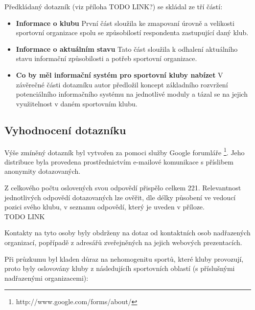 \documentclass[11pt,oneside]{fithesis}
\begin{document}
                Předkládaný dotazník (viz příloha TODO LINK?) se skládal ze tří částí:

                \begin{itemize}
                    \item \textbf{Informace o klubu} \newline
                    První část sloužila ke zmapovaní úrovně a velikosti sportovní organizace spolu se způsobilostí respondenta zastupující daný klub.
                    \item \textbf{Informace o aktuálním stavu} \newline
                    Tato část sloužila k odhalení aktuálního stavu informační způsobilosti a potřeb sportovní organizace.
                    \item \textbf{Co by měl informační systém pro sportovní kluby nabízet} \newline
                    V závěrečné části dotazníku autor předložil koncept základního rozvržení potenciálního informačního systému na jednotlivé moduly a tázal se na jejich využitelnost v daném sportovním klubu.
                \end{itemize}

                \subsection{Vyhodnocení dotazníku}
                Výše zmíněný dotazník byl vytvořen za pomoci služby Google forumláře \footnote{http://www.google.com/forms/about/}. Jeho distribuce byla provedena prostřednictvím e-mailové komunikace s příslibem anonymity dotazovaných. 

                Z celkového počtu oslovených svou odpovědí přispělo celkem 221. Relevantnost jednotlivých odpovědí dotazovaných lze ověřit, dle délky působení ve vedoucí pozici svého klubu, v seznamu odpovědí, který je uveden v příloze.\\ TODO LINK

                Kontakty na tyto osoby byly obdrženy na dotaz od kontaktních osob nadřazených organizací, popřípadě z adresářů zveřejněných na jejich webových prezentacích.

                Při průzkumu byl kladen důraz na nehomogenitu sportů, které kluby provozují, proto byly oslovovány kluby z následujícíh sportovních oblastí (s příslušnými nadřazenými organizacemi):
\end{document}

